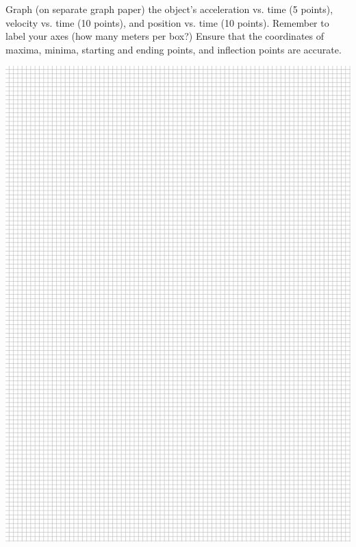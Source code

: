 \documentclass[12pt]{article}
\begin{document}
  \it \bigskip

  Graph (on separate graph paper) the object's acceleration vs. time (5 points), velocity vs. time (10 points), and position vs. time (10 points). Remember to label your axes (how many meters per box?)
  Ensure that the coordinates of maxima, minima, starting and ending points, and inflection points are accurate.

\newpage
\includegraphics[width=\textwidth]{graphpaper.png}
\newpage
\end{document}
